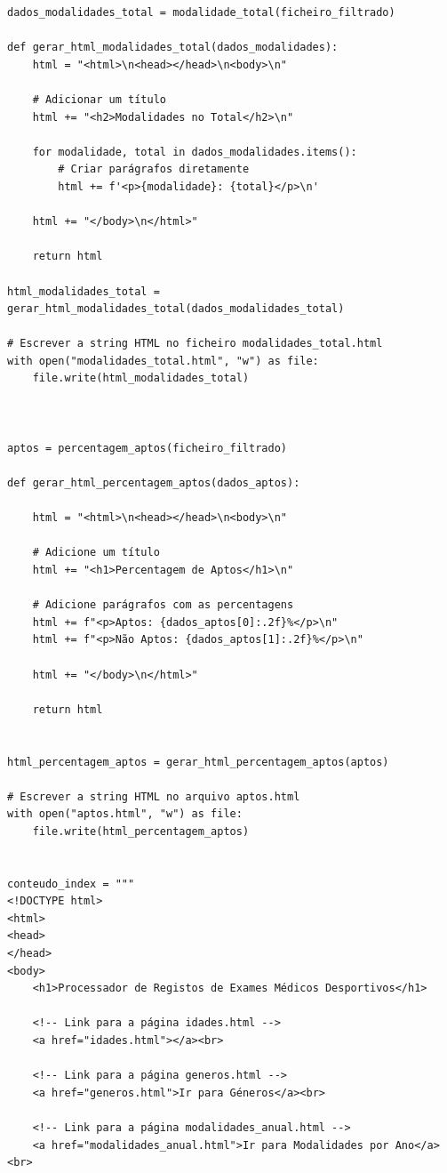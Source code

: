 \documentclass[11pt,a4paper]{report}%
\begin{document}
\begin{verbatim}
dados_modalidades_total = modalidade_total(ficheiro_filtrado)

def gerar_html_modalidades_total(dados_modalidades):
    html = "<html>\n<head></head>\n<body>\n"

    # Adicionar um título
    html += "<h2>Modalidades no Total</h2>\n"
    
    for modalidade, total in dados_modalidades.items():
        # Criar parágrafos diretamente
        html += f'<p>{modalidade}: {total}</p>\n'
    
    html += "</body>\n</html>"

    return html

html_modalidades_total = gerar_html_modalidades_total(dados_modalidades_total)

# Escrever a string HTML no ficheiro modalidades_total.html
with open("modalidades_total.html", "w") as file:
    file.write(html_modalidades_total)



aptos = percentagem_aptos(ficheiro_filtrado)

def gerar_html_percentagem_aptos(dados_aptos):

    html = "<html>\n<head></head>\n<body>\n"
    
    # Adicione um título
    html += "<h1>Percentagem de Aptos</h1>\n"

    # Adicione parágrafos com as percentagens
    html += f"<p>Aptos: {dados_aptos[0]:.2f}%</p>\n"
    html += f"<p>Não Aptos: {dados_aptos[1]:.2f}%</p>\n"
    
    html += "</body>\n</html>"

    return html


html_percentagem_aptos = gerar_html_percentagem_aptos(aptos)

# Escrever a string HTML no arquivo aptos.html
with open("aptos.html", "w") as file:
    file.write(html_percentagem_aptos)


conteudo_index = """
<!DOCTYPE html>
<html>
<head>
</head>
<body>
    <h1>Processador de Registos de Exames Médicos Desportivos</h1>
    
    <!-- Link para a página idades.html -->
    <a href="idades.html"></a><br>

    <!-- Link para a página generos.html -->
    <a href="generos.html">Ir para Géneros</a><br>

    <!-- Link para a página modalidades_anual.html -->
    <a href="modalidades_anual.html">Ir para Modalidades por Ano</a><br>


\end{verbatim}
\end{document}
